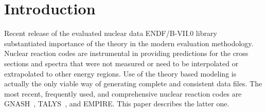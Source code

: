 \documentclass[twocolumn,amsmath,amssymb,10pt,groupedaddress,letter]{revtex4}
\begin{document}
\vspace*{12mm}
\maketitle
{}
\lfoot{}
\rfoot{}
\setlength{\headrulewidth}{0.4pt}
\setlength{\footrulewidth}{0.4pt}

\tableofcontents

%



\newpage
\section{Introduction}
Recent release of the evaluated nuclear data ENDF/B-VII.0 library~\cite{ENDF-VII} substantiated importance of the theory in the modern evaluation methodology. Nuclear reaction codes are instrumental in providing predictions for the cross sections and spectra  that were not measured or need to be interpolated or extrapolated to other energy regions. Use of the theory based modeling is actually the only viable way of generating complete and consistent data files. The most recent, frequently used, and comprehensive nuclear reaction codes are GNASH~\cite{Young:77, Young:92, Young:98}, TALYS~\cite{TALYS}, and EMPIRE. This paper describes the latter one.
\end{document}
